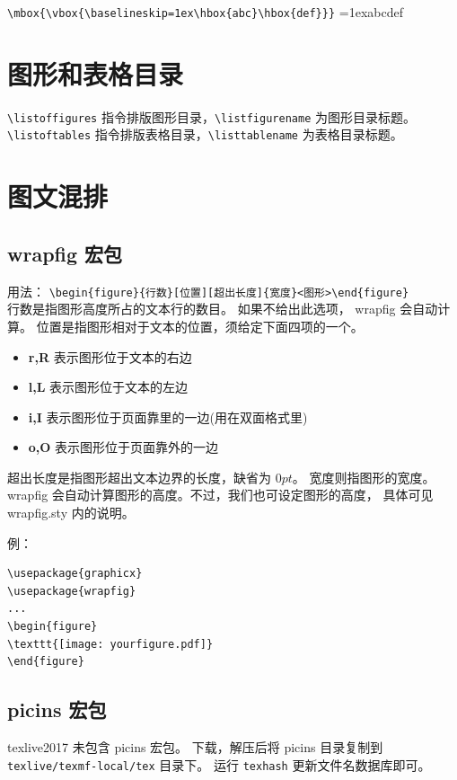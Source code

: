 \documentclass[a4paper,11pt]{article}
\begin{document}
\verb+\mbox{\vbox{\baselineskip=1ex\hbox{abc}\hbox{def}}}+\hspace{2em}
\mbox{\vbox{\baselineskip=1ex\hbox{abc}\hbox{def}}}


\section{图形和表格目录}
\verb+\listoffigures+ 指令排版图形目录，\verb+\listfigurename+
为图形目录标题。\\
\verb+\listoftables+ 指令排版表格目录，\verb+\listtablename+
为表格目录标题。

\section{图文混排}
\subsection{wrapfig 宏包}
用法：%
\verb+\begin{figure}{行数}[位置][超出长度]{宽度}<图形>\end{figure}+\\
行数是指图形高度所占的文本行的数目。 如果不给出此选项，
wrapfig 会自动计算。 位置是指图形相对于文本的位置，须给定下面四项的一个。
\begin{itemize}
	\item {\bf r,R} 表示图形位于文本的右边
	\item {\bf l,L} 表示图形位于文本的左边
	\item {\bf i,I} 表示图形位于页面靠里的一边(用在双面格式里)
	\item {\bf o,O} 表示图形位于页面靠外的一边
\end{itemize}
超出长度是指图形超出文本边界的长度，缺省为 $0pt$。 宽度则指图形的宽度。
wrapfig 会自动计算图形的高度。不过，我们也可设定图形的高度，
具体可见 wrapfig.sty 内的说明。

例：
\begin{Verbatim}
\usepackage{graphicx}
\usepackage{wrapfig}
...
\begin{figure}
\texttt{[image: yourfigure.pdf]}
\end{figure}
\end{Verbatim}

\subsection{picins 宏包}
texlive2017 未包含 picins 宏包。
下载，解压后将 picins 目录复制到 \verb+texlive/texmf-local/tex+ 目录下。
运行 \verb+texhash+ 更新文件名数据库即可。
\end{document}
